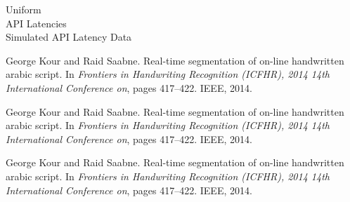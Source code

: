 \documentclass{article}
\theoremstyle{plain}
\theoremstyle{remark}
\begin{document}
Uniform\\



API Latencies\\



Simulated API Latency Data\\





\begin{thebibliography}{1}

George Kour and Raid Saabne.
\newblock Real-time segmentation of on-line handwritten arabic script.
\newblock In {\em Frontiers in Handwriting Recognition (ICFHR), 2014 14th
  International Conference on}, pages 417--422. IEEE, 2014.

George Kour and Raid Saabne.
\newblock Real-time segmentation of on-line handwritten arabic script.
\newblock In {\em Frontiers in Handwriting Recognition (ICFHR), 2014 14th
  International Conference on}, pages 417--422. IEEE, 2014.

George Kour and Raid Saabne.
\newblock Real-time segmentation of on-line handwritten arabic script.
\newblock In {\em Frontiers in Handwriting Recognition (ICFHR), 2014 14th
  International Conference on}, pages 417--422. IEEE, 2014.

\end{thebibliography}
\end{document}
